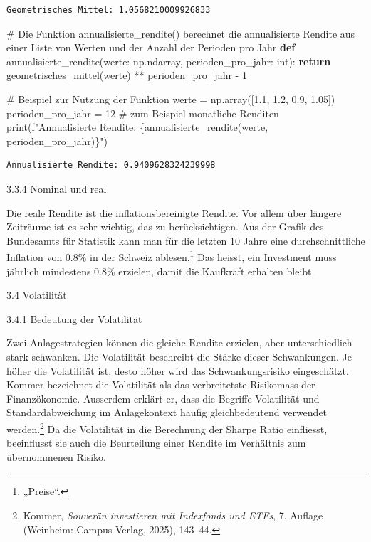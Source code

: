 \documentclass[
  ngerman,
  a4paper,
  DIV=11,
  oneside]{scrreprt}
\newenvironment{Shaded}{\begin{snugshade}}{\end{snugshade}}
\newcommand{\BuiltInTok}[1]{\textcolor[rgb]{0.00,0.23,0.31}{#1}}
\newcommand{\CommentTok}[1]{\textcolor[rgb]{0.37,0.37,0.37}{#1}}
\newcommand{\ControlFlowTok}[1]{\textcolor[rgb]{0.00,0.23,0.31}{\textbf{#1}}}
\newcommand{\DecValTok}[1]{\textcolor[rgb]{0.68,0.00,0.00}{#1}}
\newcommand{\FloatTok}[1]{\textcolor[rgb]{0.68,0.00,0.00}{#1}}
\newcommand{\KeywordTok}[1]{\textcolor[rgb]{0.00,0.23,0.31}{\textbf{#1}}}
\newcommand{\NormalTok}[1]{\textcolor[rgb]{0.00,0.23,0.31}{#1}}
\newcommand{\OperatorTok}[1]{\textcolor[rgb]{0.37,0.37,0.37}{#1}}
\newcommand{\SpecialCharTok}[1]{\textcolor[rgb]{0.37,0.37,0.37}{#1}}
\newcommand{\SpecialStringTok}[1]{\textcolor[rgb]{0.13,0.47,0.30}{#1}}
\begin{document}
\begin{verbatim}
Geometrisches Mittel: 1.0568210009926833
\end{verbatim}

\begin{Shaded}
\begin{Highlighting}[]
\CommentTok{\# Die Funktion annualisierte\_rendite() berechnet die annualisierte Rendite aus einer Liste von Werten und der Anzahl der Perioden pro Jahr}
\KeywordTok{def}\NormalTok{ annualisierte\_rendite(werte: np.ndarray, perioden\_pro\_jahr: }\BuiltInTok{int}\NormalTok{):}
    \ControlFlowTok{return}\NormalTok{ geometrisches\_mittel(werte) }\OperatorTok{**}\NormalTok{ perioden\_pro\_jahr }\OperatorTok{{-}} \DecValTok{1}

\CommentTok{\# Beispiel zur Nutzung der Funktion}
\NormalTok{werte }\OperatorTok{=}\NormalTok{ np.array([}\FloatTok{1.1}\NormalTok{, }\FloatTok{1.2}\NormalTok{, }\FloatTok{0.9}\NormalTok{, }\FloatTok{1.05}\NormalTok{])}
\NormalTok{perioden\_pro\_jahr }\OperatorTok{=} \DecValTok{12}  \CommentTok{\# zum Beispiel monatliche Renditen}
\BuiltInTok{print}\NormalTok{(}\SpecialStringTok{f"Annualisierte Rendite: }\SpecialCharTok{\{}\NormalTok{annualisierte\_rendite(werte, perioden\_pro\_jahr)}\SpecialCharTok{\}}\SpecialStringTok{"}\NormalTok{)}
\end{Highlighting}
\end{Shaded}

\begin{verbatim}
Annualisierte Rendite: 0.9409628324239998
\end{verbatim}

3.3.4 Nominal und real

Die reale Rendite ist die inflationsbereinigte Rendite. Vor allem über
längere Zeiträume ist es sehr wichtig, das zu berücksichtigen. Aus der
Grafik des Bundesamts für Statistik kann man für die letzten 10 Jahre
eine durchschnittliche Inflation von 0.8\% in der Schweiz
ablesen.\footnote{{„Preise``}.} Das heisst, ein Investment muss jährlich
mindestens 0.8\% erzielen, damit die Kaufkraft erhalten bleibt.

3.4 Volatilität

3.4.1 Bedeutung der Volatilität

Zwei Anlagestrategien können die gleiche Rendite erzielen, aber
unterschiedlich stark schwanken. Die Volatilität beschreibt die Stärke
dieser Schwankungen. Je höher die Volatilität ist, desto höher wird das
Schwankungsrisiko eingeschätzt. Kommer bezeichnet die Volatilität als
das verbreitetste Risikomass der Finanzökonomie. Ausserdem erklärt er,
dass die Begriffe Volatilität und Standardabweichung im Anlagekontext
häufig gleichbedeutend verwendet werden.\footnote{Kommer, \emph{Souverän
  investieren mit Indexfonds und ETFs}, 7. Auflage (Weinheim: Campus
  Verlag, 2025), 143--44.} Da die Volatilität in die Berechnung der
Sharpe Ratio einfliesst, beeinflusst sie auch die Beurteilung einer
Rendite im Verhältnis zum übernommenen Risiko.
\end{document}
